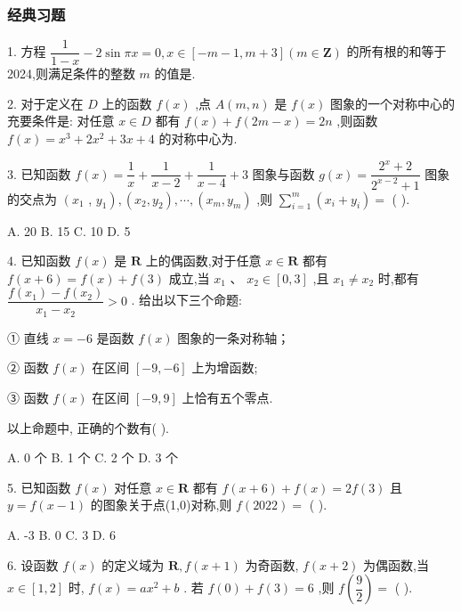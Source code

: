 \subsubsection*{经典习题}

1. 方程 $\dfrac{1}{1 - x} - 2\sin {\pi x} = 0,x \in  \left\lbrack  {-m - 1,m + 3}\right\rbrack  \left( {m \in  \mathbf{Z}}\right)$ 的所有根的和等于 2024,则满足条件的整数 $m$ 的值是\blkda{}.

2. 对于定义在 $D$ 上的函数 $f\left( x\right)$ ,点 $A\left( {m,n}\right)$ 是 $f\left( x\right)$ 图象的一个对称中心的充要条件是: 对任意 $x \in  D$ 都有 $f\left( x\right)  + f\left( {{2m} - x}\right)  = {2n}$ ,则函数 $f\left( x\right)  = {x}^{3} + 2{x}^{2} + {3x} + 4$ 的对称中心为\blkda{}.

3. 已知函数 $f\left( x\right)  = \dfrac{1}{x} + \dfrac{1}{x - 2} + \dfrac{1}{x - 4} + 3$ 图象与函数 $g\left( x\right)  = \dfrac{{2}^{x} + 2}{{2}^{x - 2} + 1}$ 图象的交点为 $\left( {x}_{1}\right.$ , $\left. {y}_{1}\right) ,\left( {{x}_{2},{y}_{2}}\right) ,\cdots ,\left( {{x}_{m},{y}_{m}}\right)$ ,则 $\mathop{\sum }\limits_{{i = 1}}^{m}\left( {{x}_{i} + {y}_{i}}\right)  =$ (   ).

A. 20 B. 15 C. 10 D. 5

4. 已知函数 $f\left( x\right)$ 是 $\mathbf{R}$ 上的偶函数,对于任意 $x \in  \mathbf{R}$ 都有 $f\left( {x + 6}\right)  = f\left( x\right)  + f\left( 3\right)$ 成立,当 ${x}_{1}$ 、 ${x}_{2} \in  \left\lbrack  {0,3}\right\rbrack$ ,且 ${x}_{1} \neq  {x}_{2}$ 时,都有 $\dfrac{f\left( {x}_{1}\right)  - f\left( {x}_{2}\right) }{{x}_{1} - {x}_{2}} > 0$ . 给出以下三个命题:

① 直线 $x =  - 6$ 是函数 $f\left( x\right)$ 图象的一条对称轴；

② 函数 $f\left( x\right)$ 在区间 $\left\lbrack  {-9, - 6}\right\rbrack$ 上为增函数;

③ 函数 $f\left( x\right)$ 在区间 $\left\lbrack  {-9,9}\right\rbrack$ 上恰有五个零点.

以上命题中, 正确的个数有(   ).

A. 0 个 B. 1 个 C. 2 个 D. 3 个

5. 已知函数 $f\left( x\right)$ 对任意 $x \in  \mathbf{R}$ 都有 $f\left( {x + 6}\right)  + f\left( x\right)  = {2f}\left( 3\right)$ 且 $y = f\left( {x - 1}\right)$ 的图象关于点(1,0)对称,则 $f\left( {2022}\right)  =$ (   ).

A. -3 B. 0 C. 3 D. 6

6. 设函数 $f\left( x\right)$ 的定义域为 $\mathbf{R},f\left( {x + 1}\right)$ 为奇函数, $f\left( {x + 2}\right)$ 为偶函数,当 $x \in  \left\lbrack  {1,2}\right\rbrack$ 时, $f\left( x\right)  = a{x}^{2} + b$ . 若 $f\left( 0\right)  + f\left( 3\right)  = 6$ ,则 $f\left( \dfrac{9}{2}\right)  =$ (   ).

